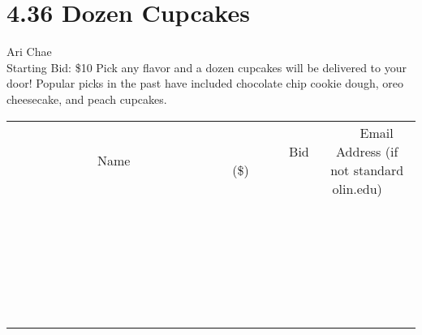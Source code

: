 \documentclass[11pt]{article}
\begin{document}
\section*{4.36 Dozen Cupcakes}
Ari Chae
\\
Starting Bid: \$10
\newline
Pick any flavor and a dozen cupcakes will be delivered to your door! Popular picks in the past have included chocolate chip cookie dough, oreo cheesecake, and peach cupcakes.
\\[6ex]
\begin{tabular}{c c c}
~~~~~~~~~~~~~Name~~~~~~~~~~~~~ & ~~~~~~~~~Bid (\$)~~~~~~~~~  & ~~~Email Address (if not standard olin.edu)~~~\\
 & & \\
\hline
 & & \\
\hline
 & & \\
\hline
 & & \\
\hline
 & & \\
\hline
 & & \\
\hline
 & & \\
\hline
 & & \\
\hline
 & & \\
\hline
 & & \\
\hline
 & & \\
\hline
 & & \\
\hline
 & & \\
\hline
 & & \\
\hline
 & & \\
\hline
 & & \\
\hline
 & & \\
\hline
 & & \\
\hline
 & & \\
\hline
 & & \\
\hline
 & & \\
\hline
 & & \\
\hline
 & & \\
\hline
 & & \\
\hline
 & & \\
\hline
 & & \\
\hline
\end{tabular}
\newpage
\end{document}
